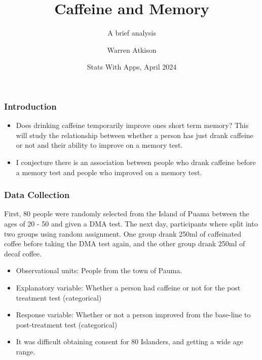 \documentclass{beamer}
\title[Final Presentation] %
{Caffeine and Memory}
\subtitle{A brief analysis}
\author[Warren Atkison] %
{Warren Atkison}
\date[\today] %
{Stats With Apps, April 2024}
\begin{document}
\frame{\titlepage}


\begin{frame}
\frametitle{Introduction}
\begin{itemize}
	
	\item Does drinking caffeine temporarily improve ones short term memory? This will study the relationship between whether a person has just drank caffeine or not and their ability to improve on a memory test. \pause

	\item I conjecture there is an association between people who drank caffeine before a memory test and people who improved on a memory test.

\end{itemize}
\end{frame}



\begin{frame}
\frametitle{Data Collection}
First, 80 people were randomly selected from the Island of Puama between the ages of 20 - 50 and given a DMA test. The next day, participants where split into two groups using random assignment. One group drank 250ml of caffeinated coffee before taking the DMA test again, and the other group drank 250ml of decaf coffee. \pause

\begin{itemize}
    \item Observational units: People from the town of Pauma. \pause
    \item Explanatory variable: Whether a person had caffeine or not for the post treatment test (categorical) \pause
    \item Response variable: Whether or not a person improved from the base-line to post-treatment test (categorical) \pause
    \item It was difficult obtaining consent for 80 Islanders, and getting a wide age range.
\end{itemize}
\end{frame}

\end{document}
